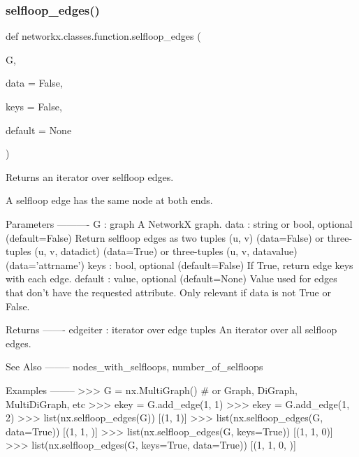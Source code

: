 \subsubsection{\texorpdfstring{selfloop\+\_\+edges()}{selfloop\_edges()}}
{\footnotesize\ttfamily def networkx.\+classes.\+function.\+selfloop\+\_\+edges (\begin{DoxyParamCaption}\item[{}]{G,  }\item[{}]{data = {\ttfamily False},  }\item[{}]{keys = {\ttfamily False},  }\item[{}]{default = {\ttfamily None} }\end{DoxyParamCaption})}

\begin{DoxyVerb}Returns an iterator over selfloop edges.

A selfloop edge has the same node at both ends.

Parameters
----------
G : graph
    A NetworkX graph.
data : string or bool, optional (default=False)
    Return selfloop edges as two tuples (u, v) (data=False)
    or three-tuples (u, v, datadict) (data=True)
    or three-tuples (u, v, datavalue) (data='attrname')
keys : bool, optional (default=False)
    If True, return edge keys with each edge.
default : value, optional (default=None)
    Value used for edges that don't have the requested attribute.
    Only relevant if data is not True or False.

Returns
-------
edgeiter : iterator over edge tuples
    An iterator over all selfloop edges.

See Also
--------
nodes_with_selfloops, number_of_selfloops

Examples
--------
>>> G = nx.MultiGraph()  # or Graph, DiGraph, MultiDiGraph, etc
>>> ekey = G.add_edge(1, 1)
>>> ekey = G.add_edge(1, 2)
>>> list(nx.selfloop_edges(G))
[(1, 1)]
>>> list(nx.selfloop_edges(G, data=True))
[(1, 1, {})]
>>> list(nx.selfloop_edges(G, keys=True))
[(1, 1, 0)]
>>> list(nx.selfloop_edges(G, keys=True, data=True))
[(1, 1, 0, {})]
\end{DoxyVerb}
 \mbox{\label{namespacenetworkx_1_1classes_1_1function_a28b04c05929fa8e2cd0a0acfde1a44a7}} 

